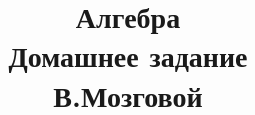 \documentclass[fleqn]{article}
\title{Алгебра \\ Домашнее задание \\ В.Мозговой}
\begin{document}
	\maketitle
	\pagebreak 
	
	
	\newpage
	
	
\end{document}
